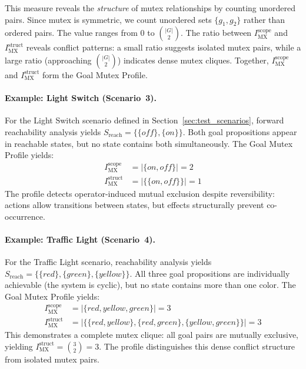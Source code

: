 This measure reveals the \emph{structure} of mutex relationships by counting unordered pairs. Since mutex is symmetric, we count unordered sets $\{g_1, g_2\}$ rather than ordered pairs. The value ranges from $0$ to $\binom{|G|}{2}$. The ratio between $I^{\text{scope}}_{\text{MX}}$ and $I^{\text{struct}}_{\text{MX}}$ reveals conflict patterns: a small ratio suggests isolated mutex pairs, while a large ratio (approaching $\binom{|G|}{2}$) indicates dense mutex cliques. Together, $I^{\text{scope}}_{\text{MX}}$ and $I^{\text{struct}}_{\text{MX}}$ form the Goal Mutex Profile.

\paragraph{Example: Light Switch (Scenario~3).} For the Light Switch scenario defined in Section~\ref{sec:test_scenarios}, forward reachability analysis yields $S_{\text{reach}} = \{\{\textit{off}\}, \{\textit{on}\}\}$. Both goal propositions appear in reachable states, but no state contains both simultaneously. The Goal Mutex Profile yields:
\begin{align*}
    I^{\text{scope}}_{\text{MX}}  & = |\{\textit{on}, \textit{off}\}| = 2     \\
    I^{\text{struct}}_{\text{MX}} & = |\{\{\textit{on}, \textit{off}\}\}| = 1
\end{align*}
The profile detects operator-induced mutual exclusion despite reversibility: actions allow transitions between states, but effects structurally prevent co-occurrence.

\paragraph{Example: Traffic Light (Scenario~4).} For the Traffic Light scenario, reachability analysis yields $S_{\text{reach}} = \{\{\textit{red}\}, \{\textit{green}\}, \{\textit{yellow}\}\}$. All three goal propositions are individually achievable (the system is cyclic), but no state contains more than one color. The Goal Mutex Profile yields:
\begin{align*}
    I^{\text{scope}}_{\text{MX}}  & = |\{\textit{red}, \textit{yellow}, \textit{green}\}| = 3                                                            \\
    I^{\text{struct}}_{\text{MX}} & = |\{\{\textit{red}, \textit{yellow}\}, \{\textit{red}, \textit{green}\}, \{\textit{yellow}, \textit{green}\}\}| = 3
\end{align*}
This demonstrates a complete mutex clique: all goal pairs are mutually exclusive, yielding $I^{\text{struct}}_{\text{MX}} = \binom{3}{2} = 3$. The profile distinguishes this dense conflict structure from isolated mutex pairs.

